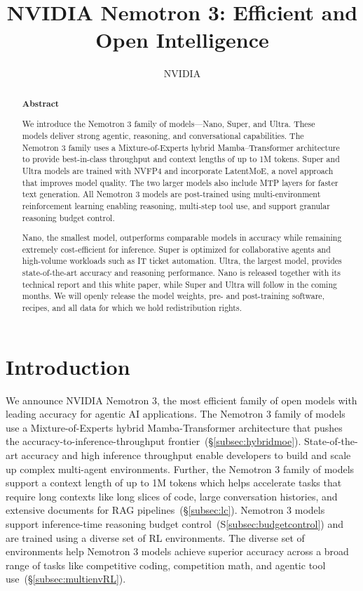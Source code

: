 \documentclass[11pt, logo, onecolumn, copyright, colorlinks=true, allcolors=blue]{nvidiatechreport}
\title{NVIDIA Nemotron 3: Efficient and Open Intelligence}
\author{\large NVIDIA}
\date{}
\begin{document}
\begin{abstract}
\large \textbf{Abstract}
\normalsize

We introduce the Nemotron 3 family of models—Nano, Super, and Ultra. These models deliver strong agentic, reasoning, and conversational capabilities. The Nemotron 3 family uses a Mixture-of-Experts hybrid Mamba–Transformer architecture to provide best-in-class throughput and context lengths of up to 1M tokens. Super and Ultra models are trained with NVFP4 and incorporate LatentMoE, a novel approach that improves model quality. The two larger models also include MTP layers for faster text generation. All Nemotron 3 models are post-trained using multi-environment reinforcement learning enabling reasoning, multi-step tool use, and support granular reasoning budget control.

Nano, the smallest model, outperforms comparable models in accuracy while remaining extremely cost-efficient for inference. Super is optimized for collaborative agents and high-volume workloads such as IT ticket automation. Ultra, the largest model, provides state-of-the-art accuracy and reasoning performance. Nano is released together with its technical report and this white paper, while Super and Ultra will follow in the coming months. We will openly release the model weights, pre- and post-training software, recipes, and all data for which we hold redistribution rights.

\end{abstract}

\maketitle

\section{Introduction}
\label{sec:intro}

We announce NVIDIA Nemotron 3, the most efficient family of open models with leading accuracy for agentic AI applications. The Nemotron 3 family of models use a Mixture-of-Experts hybrid Mamba-Transformer architecture that pushes the accuracy-to-inference-throughput frontier~(\S\ref{subsec:hybridmoe}). State-of-the-art accuracy and high inference throughput enable developers to build and scale up complex multi-agent environments. Further, the Nemotron 3 family of models support a context length of up to 1M tokens which helps accelerate tasks that require long contexts like long slices of code, large conversation histories, and extensive documents for RAG pipelines~(\S\ref{subsec:lc}). Nemotron 3 models support inference-time reasoning budget control~(S\ref{subsec:budgetcontrol}) and are trained using a diverse set of RL environments. The diverse set of environments help Nemotron 3 models achieve superior accuracy across a broad range of tasks like competitive coding, competition math, and agentic tool use~(\S\ref{subsec:multienvRL}). 
\end{document}

